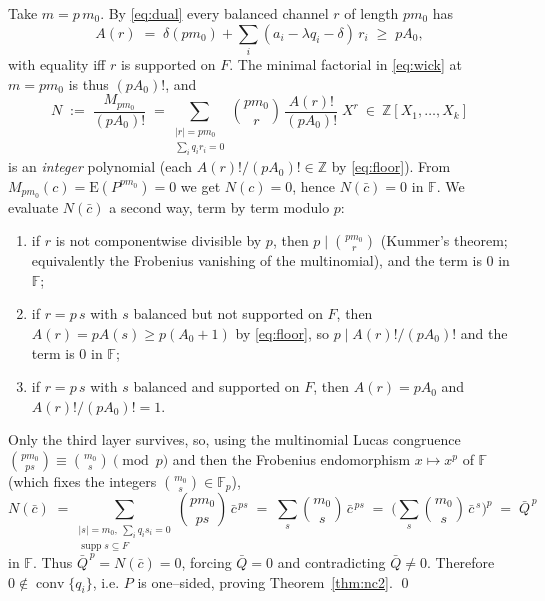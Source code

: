 \documentclass[11pt,reqno]{amsart}
\theoremstyle{plain}
\theoremstyle{definition}
\newcommand{\Z}{\mathbb{Z}}
\newcommand{\E}{\mathrm{E}}
\begin{document}
Take $m=p\,m_0$. By \eqref{eq:dual} every balanced channel $r$ of length $pm_0$ has
\begin{equation}\label{eq:floor}
  A(r)\;=\;\delta(pm_0)+\sum_i(a_i-\lambda q_i-\delta)\,r_i\;\ge\;p A_0,
\end{equation}
with equality iff $r$ is supported on $F$. The minimal factorial in \eqref{eq:wick} at $m=pm_0$ is thus
$(pA_0)!$, and
\[
  N\;:=\;\frac{M_{pm_0}}{(pA_0)!}\;=\!\!\sum_{\substack{|r|=pm_0\\ \sum_i q_i r_i=0}}\!\!
      \binom{pm_0}{r}\,\frac{A(r)!}{(pA_0)!}\;X^r\ \in\ \Z[X_1,\dots,X_k]
\]
is an \emph{integer} polynomial (each $A(r)!/(pA_0)!\in\Z$ by \eqref{eq:floor}). From
$M_{pm_0}(c)=\E(P^{pm_0})=0$ we get $N(c)=0$, hence $N(\bar c)=0$ in $\mathbb F$. We evaluate $N(\bar c)$
a second way, term by term modulo $p$:
\begin{enumerate}[label=\textup{(\arabic*)},leftmargin=2.2em]
\item if $r$ is not componentwise divisible by $p$, then $p\mid\binom{pm_0}{r}$ (Kummer's theorem;
equivalently the Frobenius vanishing of the multinomial), and the term is $0$ in $\mathbb F$;
\item if $r=p\,s$ with $s$ balanced but not supported on $F$, then $A(r)=pA(s)\ge p(A_0{+}1)$ by
\eqref{eq:floor}, so $p\mid A(r)!/(pA_0)!$ and the term is $0$ in $\mathbb F$;
\item if $r=p\,s$ with $s$ balanced and supported on $F$, then $A(r)=pA_0$ and $A(r)!/(pA_0)!=1$.
\end{enumerate}
Only the third layer survives, so, using the multinomial Lucas congruence
$\binom{pm_0}{ps}\equiv\binom{m_0}{s}\pmod p$ and then the Frobenius endomorphism $x\mapsto x^p$ of
$\mathbb F$ (which fixes the integers $\binom{m_0}{s}\in\mathbb F_p$),
\[
  N(\bar c)\;=\!\!\sum_{\substack{|s|=m_0,\ \sum_i q_i s_i=0\\ \operatorname{supp}s\subseteq F}}\!\!
     \binom{pm_0}{ps}\,\bar c^{\,ps}
  \;=\;\sum_{s}\binom{m_0}{s}\,\bar c^{\,ps}
  \;=\;\Big(\sum_{s}\binom{m_0}{s}\,\bar c^{\,s}\Big)^{\!p}
  \;=\;\bar Q^{\,p}
\]
in $\mathbb F$. Thus $\bar Q^{\,p}=N(\bar c)=0$, forcing $\bar Q=0$ and contradicting $\bar Q\ne0$.
Therefore $0\notin\operatorname{conv}\{q_i\}$, i.e. $P$ is one--sided, proving Theorem~\ref{thm:nc2}.
\qed
\end{document}
